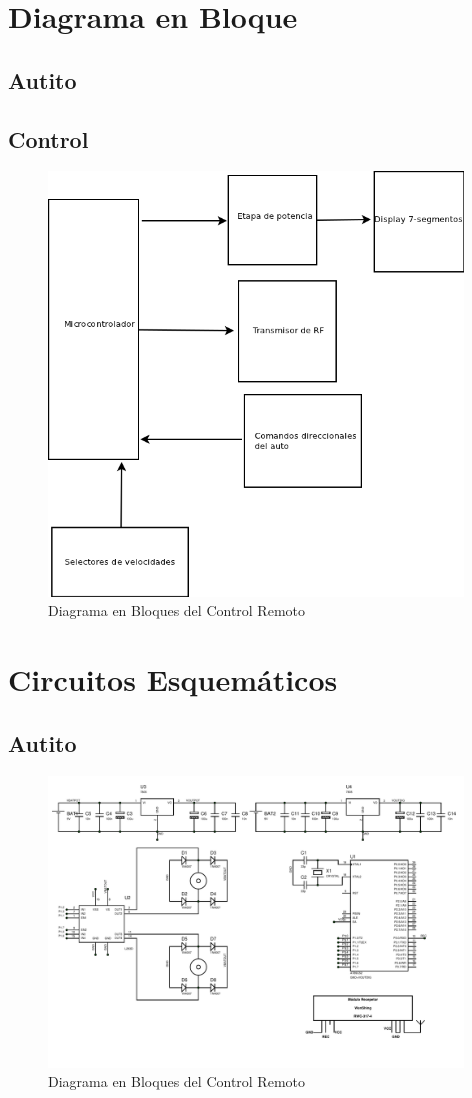 \documentclass[a4paper,10pt]{article}
\begin{document}
		
	\section{Diagrama en Bloque}
		\subsection{Autito}
		\subsection{Control}
			\begin{figure}[!htb]
				\centering
				\includegraphics[width=11cm]{Imagenes/Diagrama1.png}
				\caption{Diagrama en Bloques del Control Remoto} \label{img003}
			\end{figure}

	\section{Circuitos Esquemáticos}
		\subsection{Autito}
			\begin{figure}[!htb]
				\centering
				\includegraphics[width=11cm]{Imagenes/EsquematicoAuto.PDF}
				\caption{Diagrama en Bloques del Control Remoto} \label{img003}
			\end{figure}
		
\end{document}
